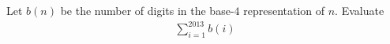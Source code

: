 Let $b(n)$ be the number of digits in the base-$4$ representation of $n$. Evaluate
\begin{align*}
\sum_{i=1}^{2013} b(i)
\end{align*}
